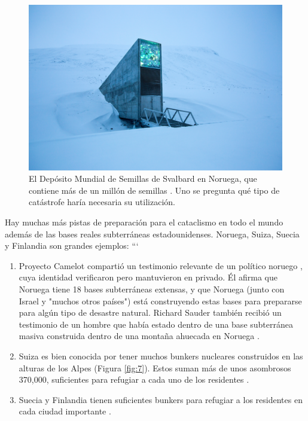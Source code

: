 \documentclass[10pt,twocolumn,letterpaper]{article}
\begin{document}
\begin{figure}[t]
\begin{center}
   \includegraphics[width=1\linewidth]{svalbard.jpg}
\end{center}
   \caption{El Depósito Mundial de Semillas de Svalbard en Noruega, que contiene más de un millón de semillas \cite{24}. Uno se pregunta qué tipo de catástrofe haría necesaria su utilización.}
\label{fig:8}
\label{fig:onecol}
\end{figure}

Hay muchas más pistas de preparación para el cataclismo en todo el mundo además de las bases reales subterráneas estadounidenses. Noruega, Suiza, Suecia y Finlandia son grandes ejemplos:
```
\begin{flushleft}
\begin{enumerate}
    \item Proyecto Camelot compartió un testimonio relevante de un político noruego \cite{25,26}, cuya identidad verificaron pero mantuvieron en privado. Él afirma que Noruega tiene 18 bases subterráneas extensas, y que Noruega (junto con Israel y "muchos otros países") está construyendo estas bases para prepararse para algún tipo de desastre natural. Richard Sauder también recibió un testimonio de un hombre que había estado dentro de una base subterránea masiva construida dentro de una montaña ahuecada en Noruega \cite{22}.
    \item Suiza es bien conocida por tener muchos bunkers nucleares construidos en las alturas de los Alpes (Figura \ref{fig:7}). Estos suman más de unos asombrosos 370,000, suficientes para refugiar a cada uno de los residentes \cite{27}.
    \item Suecia y Finlandia tienen suficientes bunkers para refugiar a los residentes en cada ciudad importante \cite{27}.
\end{enumerate}
\end{flushleft}
\end{document}
